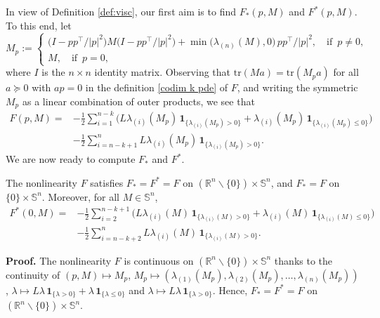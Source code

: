 \documentclass[11pt]{amsart}
\numberwithin{equation}{section}
\begin{document}
In view of Definition \ref{def:visc}, our first aim is to find $F_*(p,M)$ and $F^*(p,M)$. To this end, let
\begin{equation}
M_p:=\begin{cases}
\big(I - pp^{\top}/|p|^2\big)M\big(I - pp^{\top}/|p|^2\big)+\min\big(\lambda_{(n)}(M),0\big)\,pp^{\top}/|p|^2,
\quad\text{if }\,p\neq0, \\
M,\quad\text{if  }\,p=0,
\end{cases}
\end{equation}
where $I$ is the $n\times n$ identity matrix. Observing that $\mathrm{tr}(Ma)=\mathrm{tr}(M_pa)$ for all $a\succeq 0$ with $ap=0$ in the definition \eqref{codim k pde} of $F$, and writing the symmetric $M_p$ as a linear combination of outer products, we see that
\begin{equation}\label{F spec}
\begin{split}
F(p, M)=&-\frac{1}{2}\sum_{i=1}^{n-k} \big(L\lambda_{(i)}(M_p)\,\mathbf{1}_{\{\lambda_{(i)}(M_p)>0\}}
+\lambda_{(i)}(M_p)\,\mathbf{1}_{\{\lambda_{(i)}(M_p)\le 0\}}\big) \\
&-\frac{1}{2}\sum_{i=n-k+1}^n L\lambda_{(i)}(M_p)\,\mathbf{1}_{\{\lambda_{(i)}(M_p)>0\}}.
\end{split}
\end{equation}
We are now ready to compute $F_*$ and $F^*$. 

\begin{lemma} \label{compute F}
The nonlinearity $F$ satisfies $F_*=F^*=F$ on $({\mathbb R}^n\backslash\{0\})\times\mathbb{S}^n$, and $F_*=F$ on $\{0\}\times\mathbb{S}^n$. Moreover, for all $M\in\mathbb{S}^n$,
\begin{equation}
\begin{split}
F^*(0,M) =&-\frac{1}{2}\sum_{i=2}^{n-k+1} \big(L\lambda_{(i)}(M)\,\mathbf{1}_{\{\lambda_{(i)}(M)>0\}}
+\lambda_{(i)}(M)\,\mathbf{1}_{\{\lambda_{(i)}(M)\le 0\}}\big) \\
&-\frac{1}{2}\sum_{i=n-k+2}^n L\lambda_{(i)}(M)\,\mathbf{1}_{\{\lambda_{(i)}(M)>0\}}.
\end{split}
\end{equation}
\end{lemma}

\smallskip

\noindent\textbf{Proof.} The nonlinearity $F$ is continuous on  $({\mathbb R}^n\backslash\{0\})\times\mathbb{S}^n$ thanks to the continuity of $(p,M)\mapsto M_p$, $M_p\mapsto(\lambda_{(1)}(M_p),\lambda_{(2)}(M_p),\ldots,\lambda_{(n)}(M_p))$, $\lambda\mapsto L\lambda\,\mathbf{1}_{\{\lambda>0\}}+\lambda\,\mathbf{1}_{\{\lambda\le0\}}$ and $\lambda\mapsto L\lambda\,\mathbf{1}_{\{\lambda>0\}}$. Hence, $F_*=F^*=F$ on $({\mathbb R}^n\backslash\{0\})\times\mathbb{S}^n$. 
\end{document}
